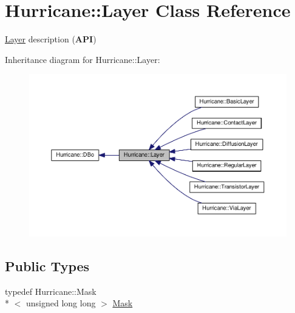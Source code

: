 \hypertarget{classHurricane_1_1Layer}{\section{Hurricane\-:\-:Layer Class Reference}
\label{classHurricane_1_1Layer}
}


\hyperlink{classHurricane_1_1Layer}{Layer} description ({\bfseries A\-P\-I})  




Inheritance diagram for Hurricane\-:\-:Layer\-:\nopagebreak
\begin{figure}[H]
\begin{center}
\leavevmode
\includegraphics[width=350pt]{classHurricane_1_1Layer__inherit__graph}
\end{center}
\end{figure}
\subsection*{Public Types}
\begin{DoxyCompactItemize}
\item 
typedef Hurricane\-::\-Mask\\*
$<$ unsigned long long $>$ \hyperlink{classHurricane_1_1Layer_af5277c670637bd5d910237e7afe01a91}{Mask}
\end{DoxyCompactItemize}

